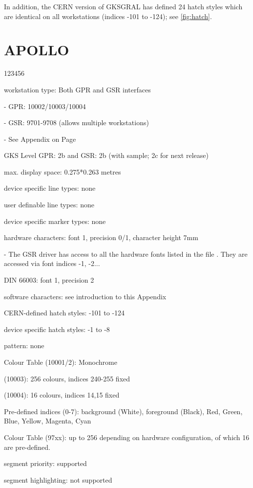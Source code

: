 In addition, the CERN version of GKSGRAL has defined 24 hatch styles
which are identical on all workstations (indices -101 to -124);
see \ref{fig:hatch}.
\section{APOLLO}
\begin{DLtt}{123456}
\item[workstation type:]Both GPR and GSR interfaces
\item[-]GPR: 10002/10003/10004
\item[-]GSR: 9701-9708 (allows multiple workstations)
\item[-]See Appendix on Page~\pageref{sec:gtstyp}
\item[GKS Level]GPR: 2b and GSR: 2b (with sample; 2c for next release)
\item[max. display space:]0.275*0.263 metres
\item[device specific line types:]none
\item[user definable line types:]none
\item[device specific marker types:]none
\item[hardware characters:]font 1, precision 0/1, character height 7mm
\item[-]The GSR driver has access to all the hardware fonts
listed in the file . They are accessed via
font indices -1, -2...
\item[DIN 66003:]font 1, precision 2
\item[software characters:]see introduction to this Appendix
\item[CERN-defined hatch styles:]-101 to -124
\item[device specific hatch styles:]-1 to -8
\item[pattern:]none
\item[Colour Table (10001/2):]Monochrome
\item[      (10003):]256 colours, indices 240-255 fixed
\item[      (10004):]16 colours, indices 14,15 fixed
\item[Pre-defined indices (0-7):]background (White), foreground (Black), Red,
Green, Blue, Yellow, Magenta, Cyan
\item[Colour Table (97xx):]up to 256 depending on hardware configuration,
of which 16 are pre-defined.
\item[segment priority:]supported
\item[segment highlighting:]not supported

\end{DLtt}
